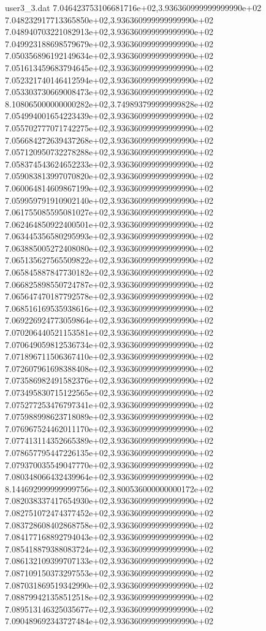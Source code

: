 \begin{filecontents}{user3_3.dat}
7.046423753106681716e+02,3.936360999999999990e+02
7.048232917713365850e+02,3.936360999999999990e+02
7.048940703221082913e+02,3.936360999999999990e+02
7.049923188698579679e+02,3.936360999999999990e+02
7.050356896192149634e+02,3.936360999999999990e+02
7.051613459683794645e+02,3.936360999999999990e+02
7.052321740146412594e+02,3.936360999999999990e+02
7.053303730669008473e+02,3.936360999999999990e+02
8.108065000000000282e+02,3.749893799999999828e+02
7.054994001654223439e+02,3.936360999999999990e+02
7.055702777071742275e+02,3.936360999999999990e+02
7.056684272639437268e+02,3.936360999999999990e+02
7.057120950732278288e+02,3.936360999999999990e+02
7.058374543624652233e+02,3.936360999999999990e+02
7.059083813997070820e+02,3.936360999999999990e+02
7.060064814609867199e+02,3.936360999999999990e+02
7.059959791910902140e+02,3.936360999999999990e+02
7.061755085595081027e+02,3.936360999999999990e+02
7.062464850922400501e+02,3.936360999999999990e+02
7.063445356580295993e+02,3.936360999999999990e+02
7.063885005272408080e+02,3.936360999999999990e+02
7.065135627565509822e+02,3.936360999999999990e+02
7.065845887847730182e+02,3.936360999999999990e+02
7.066825898550724787e+02,3.936360999999999990e+02
7.065647470187792578e+02,3.936360999999999990e+02
7.068516169535938616e+02,3.936360999999999990e+02
7.069226924773059864e+02,3.936360999999999990e+02
7.070206440521153581e+02,3.936360999999999990e+02
7.070649059812536734e+02,3.936360999999999990e+02
7.071896711506367410e+02,3.936360999999999990e+02
7.072607961698388408e+02,3.936360999999999990e+02
7.073586982491582376e+02,3.936360999999999990e+02
7.073495830715122565e+02,3.936360999999999990e+02
7.075277253476797341e+02,3.936360999999999990e+02
7.075988998623718089e+02,3.936360999999999990e+02
7.076967524462011170e+02,3.936360999999999990e+02
7.077413114352665389e+02,3.936360999999999990e+02
7.078657795447226135e+02,3.936360999999999990e+02
7.079370035549047770e+02,3.936360999999999990e+02
7.080348066432439964e+02,3.936360999999999990e+02
8.144692999999999756e+02,3.800536000000000172e+02
7.082038337417654930e+02,3.936360999999999990e+02
7.082751072474377452e+02,3.936360999999999990e+02
7.083728608402868758e+02,3.936360999999999990e+02
7.084177168892794043e+02,3.936360999999999990e+02
7.085418879388083724e+02,3.936360999999999990e+02
7.086132109399707133e+02,3.936360999999999990e+02
7.087109150373297553e+02,3.936360999999999990e+02
7.087031869519342990e+02,3.936360999999999990e+02
7.088799421358512518e+02,3.936360999999999990e+02
7.089513146325035677e+02,3.936360999999999990e+02
7.090489692343727484e+02,3.936360999999999990e+02

\end{filecontents}
